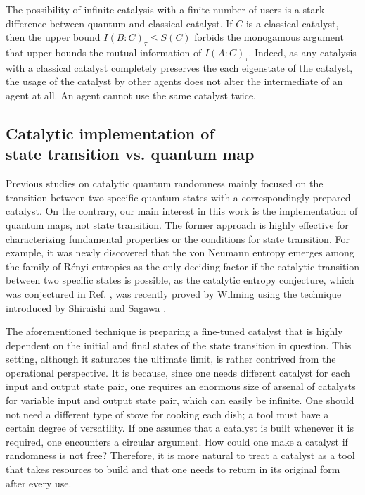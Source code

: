\documentclass[aps, reprint, amsmath,amssymb, prx, superscriptaddress]{revtex4-2}
\begin{document}
The possibility of infinite catalysis with a finite number of users is a stark difference between quantum and classical catalyst. If $C$ is a classical catalyst, then the upper bound $I(B:C)_\tau \leq S(C)$ forbids the monogamous argument that upper bounds the mutual information of $I(A:C)_\tau$. Indeed, as any catalysis with a classical catalyst completely preserves the each eigenstate of the catalyst, the usage of the catalyst by other agents does not alter the intermediate of an agent at all. An agent cannot use the same catalyst twice.


\subsection{Catalytic implementation of\\ state transition vs. quantum map}
Previous studies on catalytic quantum randomness mainly focused on the transition between two specific quantum states with a correspondingly prepared catalyst. On the contrary, our main interest in this work is the implementation of quantum maps, not state transition. The former approach is highly effective for characterizing fundamental properties or the conditions for state transition. For example, it was newly discovered that the von Neumann entropy emerges among the family of R\'{e}nyi entropies as the only deciding factor if the catalytic transition between two specific states is possible, as the catalytic entropy conjecture, which was conjectured in Ref. \cite{boes2019neumann}, was recently proved by Wilming \cite{wilming2020entropy} using the technique introduced by Shiraishi and Sagawa \cite{shiraishi2020quantum}.

The aforementioned technique is preparing a fine-tuned catalyst that is highly dependent on the initial and final states of the state transition in question. This setting, although it saturates the ultimate limit, is rather contrived from the operational perspective. It is because, since one needs different catalyst for each input and output state pair, one requires an enormous size of arsenal of catalysts for variable input and output state pair, which can easily be infinite. One should not need a different type of stove for cooking each dish; a tool must have a certain degree of versatility. If one assumes that a catalyst is built whenever it is required, one encounters a circular argument. How could one make a catalyst if randomness is not free? Therefore, it is more natural to treat a catalyst as a tool that takes resources to build and that one needs to return in its original form after every use.
\end{document}
